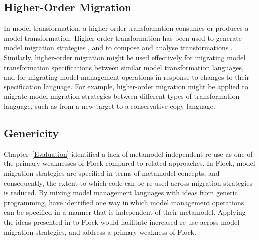 \subsection{Higher-Order Migration}
In model transformation, a higher-order transformation consumes or produces a model transformation. Higher-order transformation has been used to generate model migration strategies \cite{cicchetti08thesis,garces09managing}, and to compose and analyse transformations \cite{tisi09hot}. Similarly, higher-order migration might be used effectively for migrating model transformation specifications between similar model transformation languages, and for migrating model management operations in response to changes to their specification language. For example, higher-order migration might be applied to migrate model migration strategies between different types of transformation language, such as from a new-target to a conservative copy language.


\subsection{Genericity}
Chapter~\ref{Evaluation} identified a lack of metamodel-independent re-use as one of the primary weaknesses of Flock compared to related approaches. In Flock, model migration strategies are specified in terms of metamodel concepts, and consequently, the extent to which code can be re-used across migration strategies is reduced. By mixing model management languages with ideas from generic programming, \cite{delara10generic} have identified one way in which model management operations can be specified in a manner that is independent of their metamodel. Applying the ideas presented in \cite{delara10generic} to Flock would facilitate increased re-use across model migration strategies, and address a primary weakness of Flock. 

